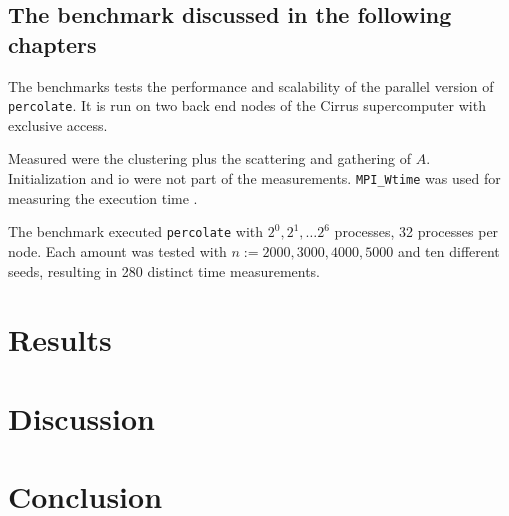 \documentclass[twoside,11pt]{article}
\def\perc{\texttt{perco\-late}}
\begin{document}


\subsection{The benchmark discussed in the following
  chapters}

The benchmarks tests the performance and scalability of the
parallel version of \perc{}.
It is run on two back end nodes of the Cirrus supercomputer
with exclusive access.

Measured were the clustering plus the scattering and
gathering of $A$.
Initialization and io were not part of the measurements.
\texttt{MPI\_Wtime} was used for measuring the execution
time \citep[see][Chapter 8]{mpi}.

The benchmark executed \perc{} with $2^0,2^1,\dots2^6$
processes, 32 processes per node.
Each amount was tested with $n := 2000, 3000, 4000, 5000$
and ten different seeds, resulting in 280 distinct time
measurements.



\section{Results} %





\section{Discussion} %


\section{Conclusion} %



\end{document}
